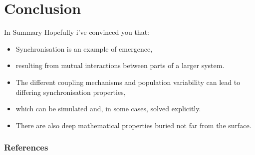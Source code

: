 \documentclass[10pt,reqno]{beamer}
\begin{document}
\section{Conclusion}
\begin{frame}{In Summary}
Hopefully i've convinced you that:
\begin{itemize}
\item Synchronisation is an example of emergence,
\item resulting from mutual interactions between parts of a larger system.
\item The different coupling mechanisms and population variability can lead to differing synchronisation properties,
\item which can be simulated and, in some cases, solved explicitly.
\item There are also deep mathematical properties buried not far from the surface.
\end{itemize}
\end{frame}
\appendix
\begin{frame}[allowframebreaks]
\frametitle{References}
\footnotesize
\printbibliography
\end{frame}
\end{document}
